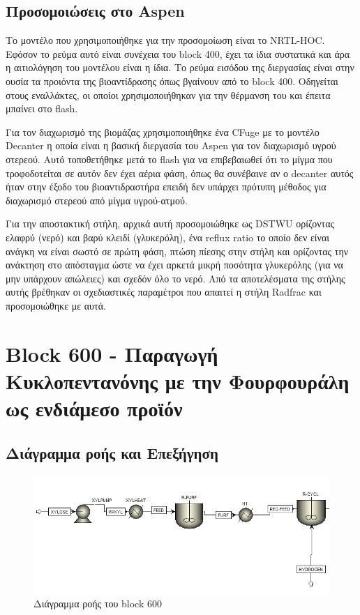 \documentclass[11pt]{article}
\begin{document}
\subsection{Προσομοιώσεις στο Aspen}
\label{sec:org835e4ee}
Το μοντέλο που χρησιμοποιήθηκε για την προσομοίωση είναι το NRTL-HOC. Εφόσον το ρεύμα αυτό είναι συνέχεια του block 400, έχει τα ίδια συστατικά και άρα η αιτιολόγηση του μοντέλου είναι η ίδια. Το ρεύμα εισόδου της διεργασίας είναι στην ουσία τα προιόντα της βιοαντίδρασης όπως βγαίνουν από το block 400. Οδηγείται στους εναλλάκτες, οι οποίοι χρησιμοποιήθηκαν για την θέρμανση του και έπειτα μπαίνει στο flash.

Για τον διαχωρισμό της βιομάζας χρησιμοποιήθηκε ένα CFuge με το μοντέλο Decanter η οποία είναι η βασική διεργασία του Aspen για τον διαχωρισμό υγρού στερεού. Αυτό τοποθετήθηκε μετά το flash για να επιβεβαιωθεί ότι το μίγμα που τροφοδοτείται σε αυτόν δεν έχει αέρια φάση, όπως θα συνέβαινε αν ο decanter αυτός ήταν στην έξοδο του βιοαντιδραστήρα επειδή δεν υπάρχει πρότυπη μέθοδος για διαχωρισμό στερεού από μίγμα υγρού-ατμού.

Για την αποστακτική στήλη, αρχικά αυτή προσομοιώθηκε ως DSTWU ορίζοντας ελαφρύ (νερό) και βαρύ κλειδί (γλυκερόλη), ένα reflux ratio το οποίο δεν είναι ανάγκη να είναι σωστό σε πρώτη φάση, πτώση πίεσης στην στήλη και ορίζοντας την ανάκτηση στο απόσταγμα ώστε να έχει αρκετά μικρή ποσότητα γλυκερόλης (για να μην υπάρχουν απώλειες) και σχεδόν όλο το νερό. Από τα αποτελέσματα της στήλης αυτής βρέθηκαν οι σχεδιαστικές παραμέτροι που απαιτεί η στήλη Radfrac και προσομοιώθηκε με αυτά.

\section{Block 600 - Παραγωγή Κυκλοπεντανόνης με την Φουρφουράλη ως ενδιάμεσο προϊόν}
\label{sec:org6beab37}

\subsection{Διάγραμμα ροής και Επεξήγηση}
\label{sec:org468377e}
\begin{figure}[htbp]
\centering
\includegraphics[width=.9\linewidth]{Block_600_-_Παραγωγή_Κυκλοπεντανόνης_με_την_Φουρφουράλη_ως_ενδιάμεσο_προϊόν/2023-01-13_17-51-52_screenshot.png}
\caption{Διάγραμμα ροής του block 600}
\end{figure}
\end{document}
